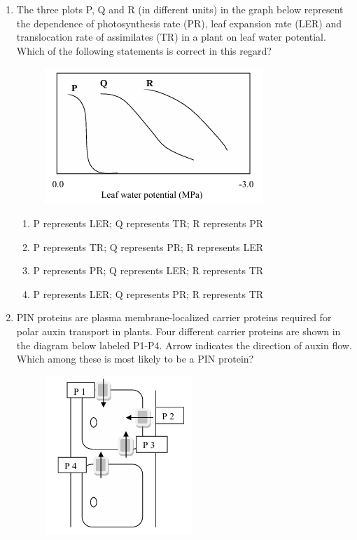 \documentclass[journal,12pt,onecolumn]{IEEEtran}
\begin{document}
\begin{enumerate}[label=\arabic*.,resume]
\item The three plots P, Q and R (in different units) in the graph below represent the dependence of photosynthesis rate (PR), leaf expansion rate (LER) and translocation rate of assimilates (TR) in a plant on leaf water potential. Which of the following statements is correct in this regard?

\begin{figure}[H]
\centering
\includegraphics[width=0.7\columnwidth]{FIG/J-13.png}
\caption*{}
\label{fig:J-13}
\end{figure}

\begin{enumerate}[label=(\Alph*)]
\item P represents LER; Q represents TR; R represents PR
\item P represents TR; Q represents PR; R represents LER
\item P represents PR; Q represents LER; R represents TR
\item P represents LER; Q represents PR; R represents TR
\end{enumerate}

\item PIN proteins are plasma membrane-localized carrier proteins required for polar auxin transport in plants. Four different carrier proteins are shown in the diagram below labeled P1-P4. Arrow indicates the direction of auxin flow. Which among these is most likely to be a PIN protein?

\begin{figure}[H]
\centering
\includegraphics[width=0.6\columnwidth]{FIG/J-14.png}
\caption*{}
\label{fig:J-14}
\end{figure}


\end{enumerate}
\end{document}
